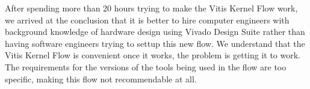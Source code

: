 \documentclass[11pt, final, conference, letterpaper, twocolumn]{IEEEtran}[2015/08/26]
\begin{document}
After spending more than 20 hours trying to make the Vitis Kernel Flow work, we arrived at the conclusion that it is better to hire computer engineers with background knowledge of hardware design using Vivado Design Suite rather than having software engineers trying to settup this new flow.
We understand that the Vitis Kernel Flow is convenient once it works, the problem is getting it to work.
The requirements for the versions of the tools being used in the flow are too specific, making this flow not recommendable at all.




\end{document}
